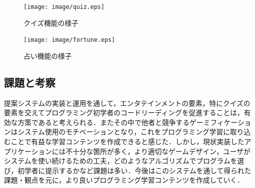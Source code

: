 \begin{figure}[!h]
  \begin{center}
    \texttt{[image: image/quiz.eps]}
  \end{center}
    \vspace{-8mm} 
  \caption{クイズ機能の様子}
  \label{quiz}
\end{figure}

\begin{figure}[!h]
  \begin{center}
    \texttt{[image: image/fortune.eps]}
  \end{center}
    \vspace{-8mm} 
  \caption{占い機能の様子}
  \label{fortune}
\end{figure}


\subsection{課題と考察}
提案システムの実装と運用を通して，エンタテインメントの要素，特にクイズの要素を交えてプログラミング初学者のコードリーディングを促進することは，有効な方策であると考えられる．またその中で他者と競争するゲーミフィケーションはシステム使用のモチベーションとなり，これをプログラミング学習に取り込むことで有益な学習コンテンツを作成できると感じた．しかし，現状実装したアプリケーションには不十分な箇所が多く，より適切なゲームデザイン，ユーザがシステムを使い続けるための工夫，どのようなアルゴリズムでプログラムを選び，初学者に提示するかなど課題は多い．今後はこのシステムを通して得られた課題・観点を元に，より良いプログラミング学習コンテンツを作成していく．
